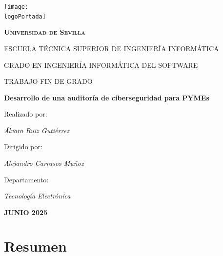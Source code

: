 \documentclass[a4paper, 11pt]{article}
\newcommand{\logoPortada}{images/logo_uni.png}
\begin{document}
    \begin{titlepage}
        \thispagestyle{empty}
        \centering
        \texttt{[image: \\logoPortada]} \par\vspace{1cm}
        {\scshape\LARGE \textbf{Universidad de Sevilla}}\par\vspace{1cm}
        {\scshape\Large ESCUELA TÉCNICA SUPERIOR DE INGENIERÍA INFORMÁTICA}\par\vspace{1cm}
        GRADO EN INGENIERÍA INFORMÁTICA DEL SOFTWARE\par\vspace{1cm}
        TRABAJO FIN DE GRADO\par\vspace{1cm}
        {\huge\bfseries Desarrollo de una auditoría de ciberseguridad para PYMEs}\par\vspace{1cm}
        Realizado por:\par\vspace{0.1cm}
        {\Large\itshape Álvaro Ruiz Gutiérrez}\par\vspace{1cm}
        Dirigido por:\par\vspace{0.1cm}
        {\Large\itshape Alejandro Carrasco Muñoz}\par\vspace{1cm}
        Departamento:\par\vspace{0.1cm}
        {\Large\itshape Tecnología Electrónica}\par\vspace{1cm}
        \scshape\Large\textbf{JUNIO 2025}
    \end{titlepage}
    \clearpage

\setcounter{page}{1}

\setlength{\parskip}{0.5cm}  %
\thispagestyle{nohead}
\section*{Resumen}
\end{document}

